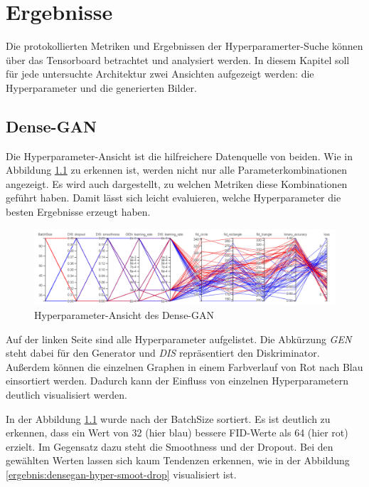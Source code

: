 
\chapter{Ergebnisse}
Die protokollierten Metriken und Ergebnissen der Hyperparamerter-Suche können über das Tensorboard betrachtet und analysiert werden.
In diesem Kapitel soll für jede untersuchte Architektur zwei Ansichten aufgezeigt werden: die Hyperparameter und die generierten Bilder.

\section{Dense-GAN}
Die Hyperparameter-Ansicht ist die hilfreichere Datenquelle von beiden.
Wie in Abbildung \ref{ergebnis:densegan-hyper} zu erkennen ist, werden nicht nur alle Parameterkombinationen angezeigt.
Es wird auch dargestellt, zu welchen Metriken diese Kombinationen geführt haben.
Damit lässt sich leicht evaluieren, welche Hyperparameter die besten Ergebnisse erzeugt haben.

\begin{figure}[H]
	\centering
	\includegraphics[width=0.75\textheight]{kapitel/5_ergebnisse/densegan/hyperparameter.PNG}
	\caption{Hyperparameter-Ansicht des Dense-GAN}
	\label{ergebnis:densegan-hyper}
\end{figure}

Auf der linken Seite sind alle Hyperparameter aufgelistet.
Die Abkürzung \textit{GEN} steht dabei für den Generator und \textit{DIS} repräsentiert den Diskriminator.
Außerdem können die einzelnen Graphen in einem Farbverlauf von Rot nach Blau einsortiert werden.
Dadurch kann der Einfluss von einzelnen Hyperparametern deutlich visualisiert werden.
\newline

In der Abbildung \ref{ergebnis:densegan-hyper} wurde nach der BatchSize sortiert.
Es ist deutlich zu erkennen, dass ein Wert von 32 (hier blau) bessere FID-Werte als 64 (hier rot) erzielt.
Im Gegensatz dazu steht die Smoothness und der Dropout.
Bei den gewählten Werten lassen sich kaum Tendenzen erkennen, wie in der Abbildung \ref{ergebnis:densegan-hyper-smoot-drop} visualisiert ist.

